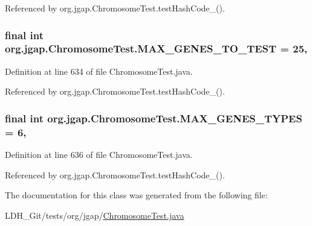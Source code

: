 Referenced by org.\-jgap.\-Chromosome\-Test.\-test\-Hash\-Code\-\_().

\hypertarget{classorg_1_1jgap_1_1_chromosome_test_a8f2eac9032a3f66194ae70969aa6ca0a}{
\subsubsection[{M\-A\-X\-\_\-\-G\-E\-N\-E\-S\-\_\-\-T\-O\-\_\-\-T\-E\-S\-T}]{\setlength{\rightskip}{0pt plus 5cm}final int org.\-jgap.\-Chromosome\-Test.\-M\-A\-X\-\_\-\-G\-E\-N\-E\-S\-\_\-\-T\-O\-\_\-\-T\-E\-S\-T = 25\hspace{0.3cm}{\ttfamily [static]}, {\ttfamily [private]}}}\label{classorg_1_1jgap_1_1_chromosome_test_a8f2eac9032a3f66194ae70969aa6ca0a}


Definition at line 634 of file Chromosome\-Test.\-java.



Referenced by org.\-jgap.\-Chromosome\-Test.\-test\-Hash\-Code\-\_().

\hypertarget{classorg_1_1jgap_1_1_chromosome_test_abab0e4e99f0b3cd4e7a7ee308d70782f}{
\subsubsection[{M\-A\-X\-\_\-\-G\-E\-N\-E\-S\-\_\-\-T\-Y\-P\-E\-S}]{\setlength{\rightskip}{0pt plus 5cm}final int org.\-jgap.\-Chromosome\-Test.\-M\-A\-X\-\_\-\-G\-E\-N\-E\-S\-\_\-\-T\-Y\-P\-E\-S = 6\hspace{0.3cm}{\ttfamily [static]}, {\ttfamily [private]}}}\label{classorg_1_1jgap_1_1_chromosome_test_abab0e4e99f0b3cd4e7a7ee308d70782f}


Definition at line 636 of file Chromosome\-Test.\-java.



Referenced by org.\-jgap.\-Chromosome\-Test.\-test\-Hash\-Code\-\_().



The documentation for this class was generated from the following file\-:\begin{DoxyCompactItemize}
\item 
L\-D\-H\-\_\-\-Git/tests/org/jgap/\hyperlink{_chromosome_test_8java}{Chromosome\-Test.\-java}\end{DoxyCompactItemize}
